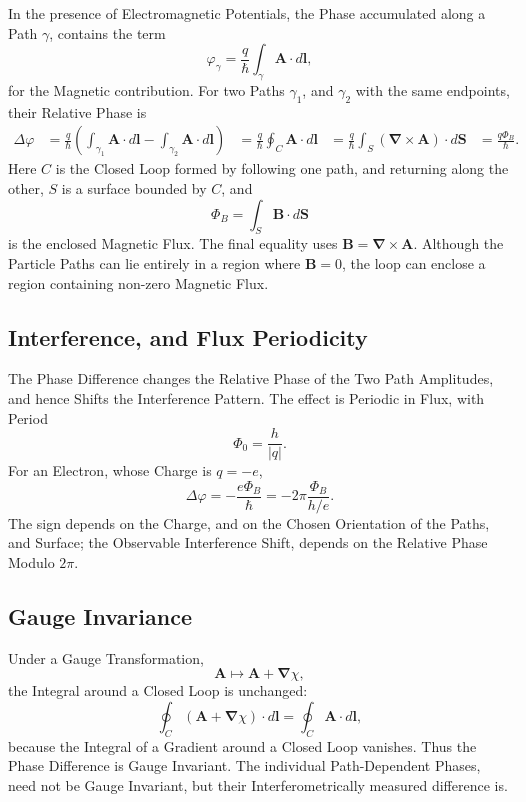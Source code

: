 \documentclass[a4paper, 10pt, onepage]{elegantbook}
\begin{document}
{In the presence of Electromagnetic Potentials, the Phase accumulated along a Path \(\gamma\), contains the term
\begin{equation}
\varphi_\gamma
=
\frac{q}{\hbar}\int_\gamma \mathbf{A}\cdot d\mathbf{l},
\end{equation}
for the Magnetic contribution. For two Paths \(\gamma_1\), and \(\gamma_2\) with the same endpoints, their Relative 
Phase is
\begin{align}
\Delta\varphi
&=
\frac{q}{\hbar}
\left(
\int_{\gamma_1}\mathbf{A}\cdot d\mathbf{l}
-
\int_{\gamma_2}\mathbf{A}\cdot d\mathbf{l}
\right)
&=
\frac{q}{\hbar}\oint_C\mathbf{A}\cdot d\mathbf{l}
&=
\frac{q}{\hbar}\int_S
(\boldsymbol{\nabla}\times\mathbf{A})\cdot d\mathbf{S}
&=
\frac{q\Phi_B}{\hbar}.
\end{align}
Here \(C\) is the Closed Loop formed by following one path, and returning along the other, \(S\) is a surface bounded 
by \(C\), and
\[
\Phi_B=\int_S\mathbf{B}\cdot d\mathbf{S}
\]
is the enclosed Magnetic Flux. The final equality uses
\(\mathbf{B}=\boldsymbol{\nabla}\times\mathbf{A}\). Although the Particle Paths can lie entirely in a region where
\(\mathbf{B}=0\), the loop can enclose a region containing non-zero Magnetic Flux.

\subsection{Interference, and Flux Periodicity}

The Phase Difference changes the Relative Phase of the Two Path Amplitudes, and hence Shifts the Interference Pattern. 
The effect is Periodic in Flux, with Period
\begin{equation}
\Phi_0=\frac{h}{|q|}.
\end{equation}
For an Electron, whose Charge is \(q=-e\),
\begin{equation}
\Delta\varphi
=
-\frac{e\Phi_B}{\hbar}
=
-2\pi\frac{\Phi_B}{h/e}.
\end{equation}
The sign depends on the Charge, and on the Chosen Orientation of the Paths, and Surface; the Observable Interference 
Shift, depends on the
Relative Phase Modulo \(2\pi\).

\subsection{Gauge Invariance}

Under a Gauge Transformation,
\begin{equation}
\mathbf{A}\longmapsto\mathbf{A}+\boldsymbol{\nabla}\chi,
\end{equation}
the Integral around a Closed Loop is unchanged:
\begin{equation}
\oint_C(\mathbf{A}+\boldsymbol{\nabla}\chi)\cdot d\mathbf{l}
=
\oint_C\mathbf{A}\cdot d\mathbf{l},
\end{equation}
because the Integral of a Gradient around a Closed Loop vanishes. Thus the Phase Difference is Gauge Invariant. The 
individual Path-Dependent Phases, need not be Gauge Invariant, but their Interferometrically measured difference is.

}
\end{document}
